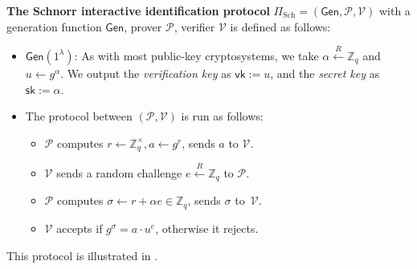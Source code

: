 \documentclass[../lecture-notes-105x135.tex]{subfiles}
\begin{document}
\begin{definition}
    \textbf{The Schnorr interactive identification protocol} $\Pi_{\text{Sch}} = (\mathsf{Gen}, \mathcal{P}, \mathcal{V})$ with a generation function $\mathsf{Gen}$, prover $\mathcal{P}$, verifier $\mathcal{V}$ is defined as follows:
    \begin{itemize}
        \item $\mathsf{Gen}(1^{\lambda})$: As with most public-key cryptosystems, we take $\alpha \xleftarrow{R} \mathbb{Z}_q$ and $u \gets g^{\alpha}$. We output the \textit{verification key} as $\mathsf{vk} := u$, and the \textit{secret key} as $\mathsf{sk} := \alpha$.
        \item The protocol between $(\mathcal{P},\mathcal{V})$ is run as follows:
        \begin{itemize}
            \item $\mathcal{P}$ computes $r \gets \mathbb{Z}_q^{\times}, a \gets g^{r}$, sends $a$ to $\mathcal{V}$.
            \item $\mathcal{V}$ sends a random challenge $e \xleftarrow{R} \mathbb{Z}_q$ to $\mathcal{P}$.
            \item $\mathcal{P}$ computes $\sigma \gets r + \alpha e \in \mathbb{Z}_q$, sends $\sigma$ to~$\mathcal{V}$.
            \item $\mathcal{V}$ accepts if $g^{\sigma} = a \cdot u^e$, otherwise it rejects.
        \end{itemize}
    \end{itemize}

    This protocol is illustrated in . 
\end{definition}

\vspace{-6mm}
\end{document}
